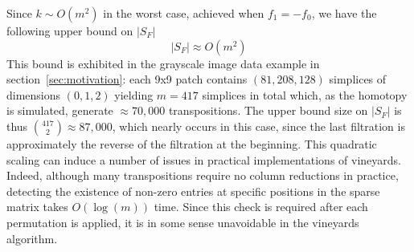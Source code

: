 \documentclass{article} %
\begin{document}
Since $k \sim O(m^2)$ in the worst case, achieved when $f_1 = - f_0$, we have the following upper bound on $\lvert S_F \rvert$
\begin{equation}\label{eq:sf_m2}
	\lvert S_F \rvert \approx O(m^2)
\end{equation}   
 This bound is exhibited in the grayscale image data example in section~\ref{sec:motivation}: each 9x9 patch contains $(81, 208, 128)$ simplices of dimensions $(0, 1, 2)$ yielding $m=417$ simplices in total which, as the homotopy is simulated, generate $\approx 70,\!000$ transpositions. The upper bound size on $\lvert S_F \rvert$ is thus $\binom{417}{2} \approx 87,\!000$, which nearly occurs in this case, since the last filtration is approximately the reverse of the filtration at the beginning.   
 This quadratic scaling can induce a number of issues in practical implementations of vineyards.
 Indeed, although many transpositions require no column reductions in practice, detecting the existence of non-zero entries at specific positions in the sparse matrix takes $O(\log(m))$ time. 
 Since this check is required after each permutation is applied, it is in some sense unavoidable in the vineyards algorithm. 
\end{document}
